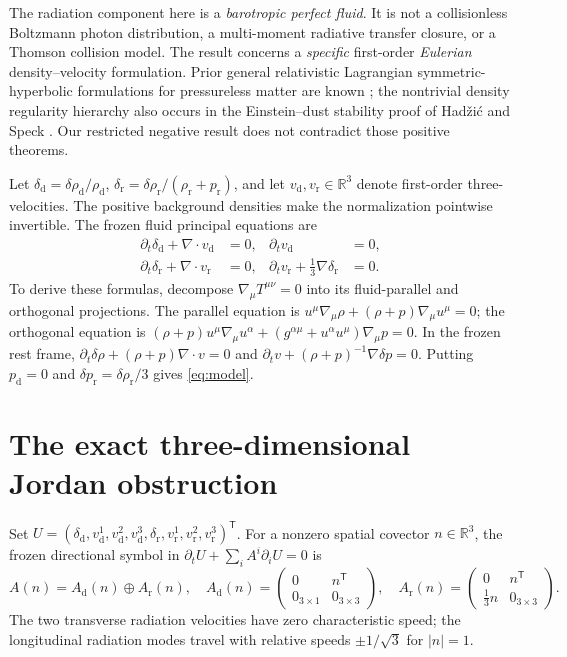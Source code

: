 \documentclass[11pt,a4paper]{article}
\newcommand{\R}{\mathbb R}
\begin{document}
The radiation component here is a \emph{barotropic perfect fluid}.
It is not a collisionless Boltzmann photon distribution, a
multi-moment radiative transfer closure, or a Thomson collision model.
The result concerns a \emph{specific} first-order
\emph{Eulerian} density--velocity formulation. Prior general
relativistic Lagrangian symmetric-hyperbolic formulations for
pressureless matter are known \cite{friedrich,normann};
the nontrivial density regularity hierarchy also occurs in
the Einstein--dust stability proof of Had\v{z}i\'c and Speck
\cite{hadzic}. Our restricted negative result does not
contradict those positive theorems.

Let $\delta_{\mathrm d}=\delta\rho_{\mathrm d}/\rho_{\mathrm d}$,
$\delta_{\mathrm r}=\delta\rho_{\mathrm r}/(\rho_{\mathrm r}+p_{\mathrm r})$,
and let $v_{\mathrm d},v_{\mathrm r}\in\R^3$ denote first-order
three-velocities. The positive background densities make the
normalization pointwise invertible. The frozen fluid principal
equations are
\begin{equation}\label{eq:model}
\begin{aligned}
\partial_t\delta_{\mathrm d}+\nabla\cdot v_{\mathrm d}&=0,
&\partial_t v_{\mathrm d}&=0,\\
\partial_t\delta_{\mathrm r}+\nabla\cdot v_{\mathrm r}&=0,
&\partial_t v_{\mathrm r}+\frac13\nabla\delta_{\mathrm r}&=0 .
\end{aligned}
\end{equation}
To derive these formulas, decompose
$\nabla_\mu T^{\mu\nu}=0$ into its fluid-parallel and
orthogonal projections. The parallel equation is
$u^\mu\nabla_\mu\rho+(\rho+p)\nabla_\mu u^\mu=0$;
the orthogonal equation is
$(\rho+p)u^\mu\nabla_\mu u^\alpha+
(g^{\alpha\mu}+u^\alpha u^\mu)\nabla_\mu p=0$.
In the frozen rest frame, $\partial_t\delta\rho+
(\rho+p)\nabla\cdot v=0$ and
$\partial_tv+(\rho+p)^{-1}\nabla\delta p=0$.
Putting $p_{\mathrm d}=0$ and
$\delta p_{\mathrm r}=\delta\rho_{\mathrm r}/3$
gives \eqref{eq:model}.

\section{The exact three-dimensional Jordan obstruction}
Set $U=(\delta_{\mathrm d},v_{\mathrm d}^1,v_{\mathrm d}^2,v_{\mathrm d}^3,
\delta_{\mathrm r},v_{\mathrm r}^1,v_{\mathrm r}^2,v_{\mathrm r}^3)^\mathsf T$.
For a nonzero spatial covector $n\in\R^3$, the frozen
directional symbol in $\partial_tU+\sum_i A^i\partial_iU=0$ is
\begin{equation}\label{eq:symbol}
A(n)=A_{\mathrm d}(n)\oplus A_{\mathrm r}(n),\quad
A_{\mathrm d}(n)=
\begin{pmatrix}0&n^\mathsf T\\0_{3\times1}&0_{3\times3}\end{pmatrix},
\quad
A_{\mathrm r}(n)=
\begin{pmatrix}0&n^\mathsf T\\\frac13n&0_{3\times3}\end{pmatrix}.
\end{equation}
The two transverse radiation velocities have zero
characteristic speed; the longitudinal radiation modes travel
with relative speeds $\pm1/\sqrt3$ for $|n|=1$.
\end{document}
